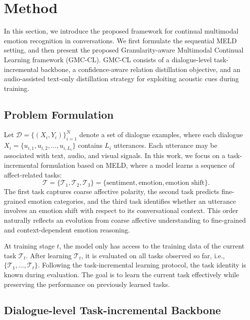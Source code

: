 \section{Method}
\label{sec:method}

In this section, we introduce the proposed framework for continual multimodal emotion recognition in conversations. We first formulate the sequential MELD setting, and then present the proposed Granularity-aware Multimodal Continual Learning framework (GMC-CL). GMC-CL consists of a dialogue-level task-incremental backbone, a confidence-aware relation distillation objective, and an audio-assisted text-only distillation strategy for exploiting acoustic cues during training.

\subsection{Problem Formulation}
\label{subsec:problem_formulation}

Let $\mathcal{D}=\{(X_i,Y_i)\}_{i=1}^{N}$ denote a set of dialogue examples, where each dialogue $X_i=\{u_{i,1},u_{i,2},\ldots,u_{i,L_i}\}$ contains $L_i$ utterances. Each utterance may be associated with text, audio, and visual signals. In this work, we focus on a task-incremental formulation based on MELD, where a model learns a sequence of affect-related tasks:
\begin{equation}
    \mathcal{T} = \{\mathcal{T}_1,\mathcal{T}_2,\mathcal{T}_3\}
    = \{\text{sentiment}, \text{emotion}, \text{emotion shift}\}.
\end{equation}
The first task captures coarse affective polarity, the second task predicts fine-grained emotion categories, and the third task identifies whether an utterance involves an emotion shift with respect to its conversational context. This order naturally reflects an evolution from coarse affective understanding to fine-grained and context-dependent emotion reasoning.

At training stage $t$, the model only has access to the training data of the current task $\mathcal{T}_t$. After learning $\mathcal{T}_t$, it is evaluated on all tasks observed so far, i.e., $\{\mathcal{T}_1,\ldots,\mathcal{T}_t\}$. Following the task-incremental learning protocol, the task identity is known during evaluation. The goal is to learn the current task effectively while preserving the performance on previously learned tasks.

\subsection{Dialogue-level Task-incremental Backbone}
\label{subsec:dialogue_backbone}


